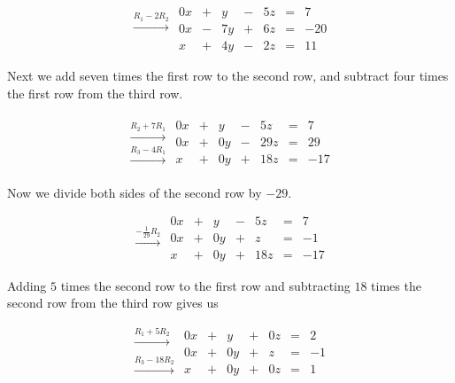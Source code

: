 \documentclass{ximera}
\begin{document}
\begin{example}
\begin{explanation}
$$\begin{array}{c}
 \xrightarrow{R_1-2R_2}\\
 \\
\\
 \end{array}
 \begin{array}{ccccccc}
      0x &+ &y&-&5z&= &7 \\
	 0x& -&7y&+&6z&=&-20\\
     x& +&4y&-&2z&=&11
    \end{array}$$

Next we add seven times the first row to the second row, and subtract four times the first row from the third row. 

$$\begin{array}{c}
 \\
 \xrightarrow{R_2+7R_1}\\
\xrightarrow{R_3-4R_1}\\
 \end{array}
 \begin{array}{ccccccc}
      0x & +&y&-&5z&= &7 \\
	 0x& +&0y&-&29z&=&29\\
     x& +&0y&+&18z&=&-17
    \end{array}$$
    
    Now we divide both sides of the second row by $-29$.
    
    $$
    \begin{array}{c}
    \\
 \xrightarrow{-\frac{1}{29}R_2}\\
\\
 \end{array}
 \begin{array}{ccccccc}
      0x & +&y&-&5z&= &7 \\
	 0x& +&0y&+&z&=&-1\\
     x& +&0y&+&18z&=&-17
    \end{array}$$
    
    Adding $5$ times the second row to the first row and subtracting $18$ times the second row from the third row gives us
    
    $$\begin{array}{c}
 \xrightarrow{R_1+5R_2}\\
 \\
\xrightarrow{R_3-18R_2}\\
 \end{array}
 \begin{array}{ccccccc}
      0x & +&y&+&0z&= &2 \\
	 0x& +&0y&+&z&=&-1\\
     x& +&0y&+&0z&=&1
    \end{array}$$


\end{explanation}
\end{example}
\end{document}
